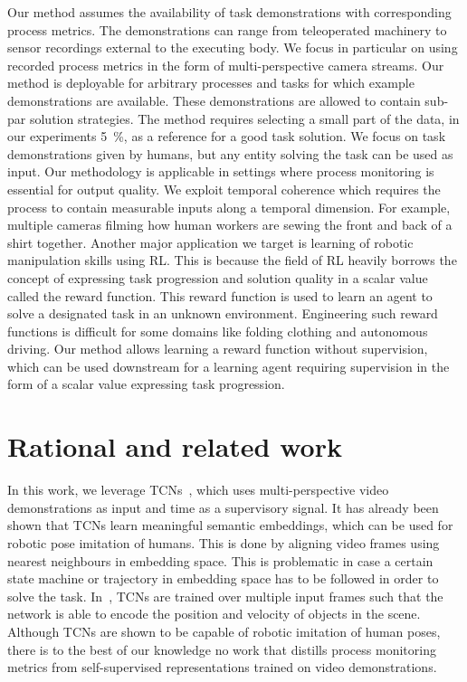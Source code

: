 \documentclass[\home/main.tex]{subfiles}
\begin{document}
Our method assumes the availability of task demonstrations with corresponding process metrics. The demonstrations can range from teleoperated machinery to sensor recordings external to the executing body. We focus in particular on using recorded process metrics in the form of multi-perspective camera streams. Our method is deployable for arbitrary processes and tasks for which example demonstrations are available. These demonstrations are allowed to contain sub-par solution strategies. The method requires selecting a small part of the data, in our experiments \qty{5}{\percent}, as a reference for a good task solution. We focus on task demonstrations given by humans, but any entity solving the task can be used as input. Our methodology is applicable in settings where process monitoring is essential for output quality. We exploit temporal coherence which requires the process to contain measurable inputs along a temporal dimension.
For example, multiple cameras filming how human workers are sewing the front and back of a shirt together.
Another major application we target is learning of robotic manipulation skills using RL. This is because the field of RL heavily borrows the concept of expressing task progression and solution quality in a scalar value called the reward function. This reward function is used to learn an agent to solve a designated task in an unknown environment. Engineering such reward functions is difficult for some domains like folding clothing and autonomous driving. Our method allows learning a reward function without supervision, which can be used downstream for a learning agent requiring supervision in the form of a scalar value expressing task progression.

\section{Rational and related work}



In this work, we leverage TCNs~\cite{Sermanet2017TCN}, which uses multi-perspective video demonstrations as input and time as a supervisory signal. It has already been shown that TCNs learn meaningful semantic embeddings, which can be used for robotic pose imitation of humans. This is done by aligning video frames using nearest neighbours in embedding space. This is problematic in case a certain state machine or trajectory in embedding space has to be followed in order to solve the task. In~\cite{Dwibedi2018mfTCN}, TCNs are trained over multiple input frames such that the network is able to encode the position and velocity of objects in the scene. Although TCNs are shown to be capable of robotic imitation of human poses, there is to the best of our knowledge no work that distills process monitoring metrics from self-supervised representations trained on video demonstrations. %
\end{document}

